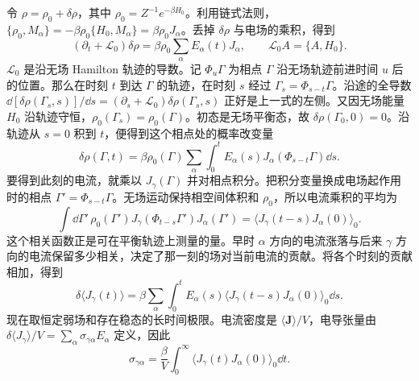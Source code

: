 令 $\rho=\rho_0+\delta\rho$，其中 $\rho_0=Z^{-1}e^{-\beta H_0}$。利用链式法则，$\{\rho_0,M_\alpha\}=-\beta\rho_0\{H_0,M_\alpha\}=\beta\rho_0J_\alpha$。丢掉 $\delta\rho$ 与电场的乘积，得到
\begin{equation}
(\partial_t+\mathcal L_0)\delta\rho
=\beta\rho_0\sum_\alpha E_\alpha(t)J_\alpha,
\qquad \mathcal L_0 A=\{A,H_0\}.
\end{equation}
$\mathcal L_0$ 是沿无场 Hamilton 轨迹的导数。记 $\Phi_u\Gamma$ 为相点 $\Gamma$ 沿无场轨迹前进时间 $u$ 后的位置。那么在时刻 $t$ 到达 $\Gamma$ 的轨迹，在时刻 $s$ 经过 $\Gamma_s=\Phi_{s-t}\Gamma$。沿途的全导数 $\dd[\delta\rho(\Gamma_s,s)]/\dd s=(\partial_s+\mathcal L_0)\delta\rho(\Gamma_s,s)$ 正好是上一式的左侧。又因无场能量 $H_0$ 沿轨迹守恒，$\rho_0(\Gamma_s)=\rho_0(\Gamma)$。初态是无场平衡态，故 $\delta\rho(\Gamma_0,0)=0$。沿轨迹从 $s=0$ 积到 $t$，便得到这个相点处的概率改变量
\begin{equation}
 \delta\rho(\Gamma,t)=\beta\rho_0(\Gamma)\sum_\alpha\int_0^t
 E_\alpha(s)J_\alpha(\Phi_{s-t}\Gamma)\dd s .
\end{equation}
要得到此刻的电流，就乘以 $J_\gamma(\Gamma)$ 并对相点积分。把积分变量换成电场起作用时的相点 $\Gamma'=\Phi_{s-t}\Gamma$。无场运动保持相空间体积和 $\rho_0$，所以电流乘积的平均为
\begin{equation}
 \int\dd\Gamma'\,\rho_0(\Gamma')J_\gamma(\Phi_{t-s}\Gamma')J_\alpha(\Gamma')
 =\langle J_\gamma(t-s)J_\alpha(0)\rangle_0 .
\end{equation}
这个相关函数正是可在平衡轨迹上测量的量。早时 $\alpha$ 方向的电流涨落与后来 $\gamma$ 方向的电流保留多少相关，决定了那一刻的场对当前电流的贡献。将各个时刻的贡献相加，得到
\begin{equation}
\delta\langle J_\gamma(t)\rangle
=\beta\sum_\alpha\int_0^t E_\alpha(s)
\langle J_\gamma(t-s)J_\alpha(0)\rangle_0\dd s.
\end{equation}
现在取恒定弱场和存在稳态的长时间极限。电流密度是 $\langle\bm J\rangle/V$，电导张量由 $\delta\langle J_\gamma\rangle/V=\sum_\alpha\sigma_{\gamma\alpha}E_\alpha$ 定义，因此
\begin{equation}
\sigma_{\gamma\alpha}=\frac\beta V\int_0^\infty
\langle J_\gamma(t)J_\alpha(0)\rangle_0\dd t.
\end{equation}
